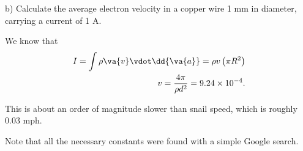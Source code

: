 \documentclass[12pt,a4paper]{article}
\begin{document}
b) Calculate the average electron velocity in a copper wire 1 \si{\milli\metre} in diameter, carrying a current of 1 \si{\ampere}.

We know that
\begin{align*}
    I = \int \rho \va{v} \vdot \dd{\va{a}} = \rho v \left( \pi R^2 \right) \\
    v = \frac{4\pi}{\rho d^2} = 9.24 \times 10^{-4}
.\end{align*}

This is about an order of magnitude slower than snail speed, which is roughly 0.03 mph.

Note that all the necessary constants were found with a simple Google search.
\end{document}
